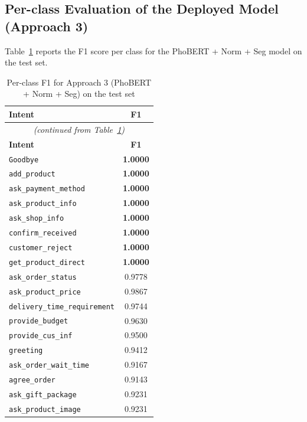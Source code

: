 \documentclass[12pt, a4paper]{report}
\begin{document}
\subsection{Per-class Evaluation of the Deployed Model (Approach 3)}

Table~\ref{tab:perclass_intent} reports the F1 score per class
for the PhoBERT + Norm + Seg model on the test set.

\begin{longtable}{lc}
\caption{Per-class F1 for Approach 3 (PhoBERT + Norm + Seg) on the test set}
\label{tab:perclass_intent} \\
\toprule
\textbf{Intent} & \textbf{F1} \\
\midrule
\endfirsthead
\multicolumn{2}{c}{\textit{(continued from Table~\ref{tab:perclass_intent})}} \\
\toprule
\textbf{Intent} & \textbf{F1} \\
\midrule
\endhead
\bottomrule
\endlastfoot
\texttt{Goodbye}                    & \textbf{1.0000} \\
\texttt{add\_product}               & \textbf{1.0000} \\
\texttt{ask\_payment\_method}       & \textbf{1.0000} \\
\texttt{ask\_product\_info}         & \textbf{1.0000} \\
\texttt{ask\_shop\_info}            & \textbf{1.0000} \\
\texttt{confirm\_received}          & \textbf{1.0000} \\
\texttt{customer\_reject}           & \textbf{1.0000} \\
\texttt{get\_product\_direct}       & \textbf{1.0000} \\
\texttt{ask\_order\_status}         & 0.9778 \\
\texttt{ask\_product\_price}        & 0.9867 \\
\texttt{delivery\_time\_requirement}& 0.9744 \\
\texttt{provide\_budget}            & 0.9630 \\
\texttt{provide\_cus\_inf}          & 0.9500 \\
\texttt{greeting}                   & 0.9412 \\
\texttt{ask\_order\_wait\_time}     & 0.9167 \\
\texttt{agree\_order}               & 0.9143 \\
\texttt{ask\_gift\_package}         & 0.9231 \\
\texttt{ask\_product\_image}        & 0.9231 \\

\end{longtable}
\end{document}
